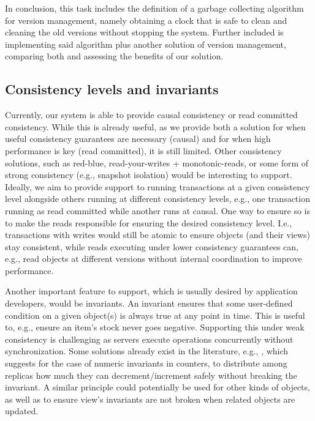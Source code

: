 In conclusion, this task includes the definition of a garbage collecting algorithm for version management, namely obtaining a clock that is safe to clean and cleaning the old versions without stopping the system.
Further included is implementing said algorithm plus another solution of version management, comparing both and assessing the benefits of our solution.

\subsection{Consistency levels and invariants}

Currently, our system is able to provide causal consistency or read committed consistency.
While this is already useful, as we provide both a solution for when useful consistency guarantees are necessary (causal) and for when high performance is key (read committed), it is still limited.
Other consistency solutions, such as red-blue, read-your-writes + monotonic-reads, or some form of strong consistency (e.g., snapshot isolation) would be interesting to support.
Ideally, we aim to provide support to running transactions at a given consistency level alongside others running at different consistency levels, e.g., one transaction running as read committed while another runs at causal.
One way to ensure so is to make the reads responsible for ensuring the desired consistency level.
I.e., transactions with writes would still be atomic to ensure objects (and their views) stay consistent, while reads executing under lower consistency guarantees can, e.g., read objects at different versions without internal coordination to improve performance.

Another important feature to support, which is usually desired by application developers, would be invariants.
An invariant ensures that some user-defined condition on a given object(s) is always true at any point in time.
This is useful to, e.g., ensure an item's stock never goes negative.
Supporting this under weak consistency is challenging as servers execute operations concurrently without synchronization.
Some solutions already exist in the literature, e.g., \cite{boundedCounter}, which suggests for the case of numeric invariants in counters, to distribute among replicas how much they can decrement/increment safely without breaking the invariant.
A similar principle could potentially be used for other kinds of objects, as well as to ensure view's invariants are not broken when related objects are updated.

